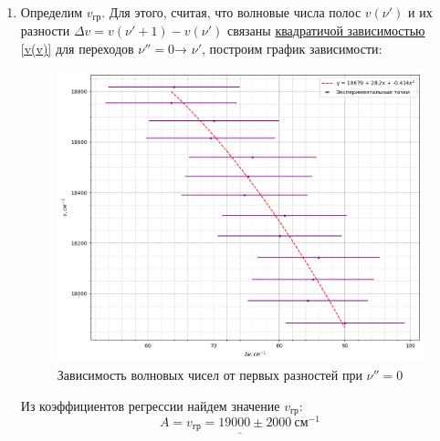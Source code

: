 \documentclass{article}
\begin{document}
\begin{enumerate}
\item Определим $v_{гр}$. Для этого, считая, что волновые числа полос $v(\nu')$ и их разности $\Delta v = v(\nu'+1)-v(\nu')$ связаны \hyperref[v(v)]{квадратичой зависимостью \ref*{v(v)}} для переходов $\nu'' = 0 $→ $\nu'$, построим график зависимости:

\begin{figure}[h!]
    \centering
    \includegraphics[scale = 0.5]{I2-granitsa.png}
    \caption{Зависимость волновых чисел от первых разностей при $\nu''=0$}
    \label{fig:I2-gr}
\end{figure}
Из коэффициентов регрессии найдем значение $v_{гр}$:
\begin{equation*}
    \underline{ A = v_{гр} = 19000 \pm 2000 ~см^{-1}}
\end{equation*}


\end{enumerate}
\end{document}
